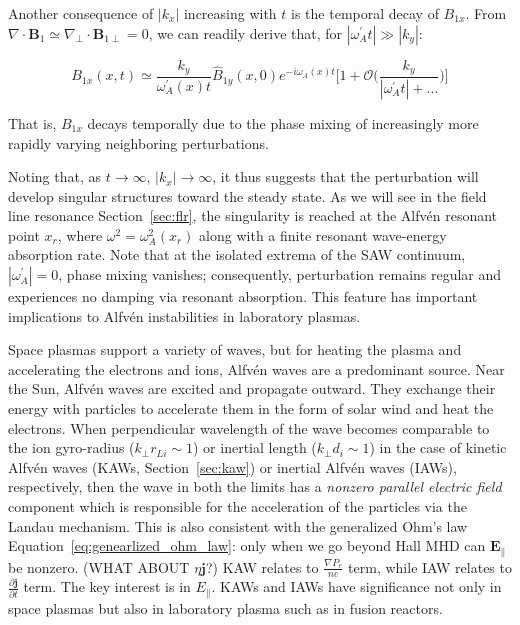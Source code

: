 \documentclass[
  notoc %
]{tufte-book}
\begin{document}
Another consequence of \(|k_x|\) increasing with \(t\) is the temporal
decay of \(B_{1x}\). From
\(\nabla\cdot\mathbf{B}_1 \simeq \nabla_\perp\cdot\mathbf{B}_{1\perp}=0\),
we can readily derive that, for \(|\omega_A^\prime t|\gg |k_y|\):

\[
B_{1x}(x, t)\simeq \frac{k_y}{\omega_A^\prime(x)t}\hat{B}_{1y}(x,0)e^{-i\omega_A(x)t}\Big[ 1+\mathcal{O}\Big( \frac{k_y}{|\omega_A^\prime t|+ ...} \Big) \Big]
\]

That is, \(B_{1x}\) decays temporally due to the phase mixing of
increasingly more rapidly varying neighboring perturbations.

Noting that, as \(t\rightarrow\infty\), \(|k_x|\rightarrow\infty\), it
thus suggests that the perturbation will develop singular structures
toward the steady state. As we will see in the field line resonance
Section~\ref{sec:flr}, the singularity is reached at the Alfvén resonant
point \(x_r\), where \(\omega^2=\omega_A^2(x_r)\) along with a finite
resonant wave-energy absorption rate. Note that at the isolated extrema
of the SAW continuum, \(|\omega_A^\prime|=0\), phase mixing vanishes;
consequently, perturbation remains regular and experiences no damping
via resonant absorption. This feature has important implications to
Alfvén instabilities in laboratory plasmas.

Space plasmas support a variety of waves, but for heating the plasma and
accelerating the electrons and ions, Alfvén waves are a predominant
source. Near the Sun, Alfvén waves are excited and propagate outward.
They exchange their energy with particles to accelerate them in the form
of solar wind and heat the electrons. When perpendicular wavelength of
the wave becomes comparable to the ion gyro-radius
(\(k_\perp r_{Li}\sim 1\)) or inertial length (\(k_\perp d_i \sim 1\))
in the case of kinetic Alfvén waves (KAWs, Section~\ref{sec:kaw}) or
inertial Alfvén waves (IAWs), respectively, then the wave in both the
limits has a \emph{nonzero parallel electric field} component which is
responsible for the acceleration of the particles via the Landau
mechanism. This is also consistent with the generalized Ohm's law
Equation~\ref{eq:genearlized_ohm_law}: only when we go beyond Hall MHD
can \(\mathbf{E}_\parallel\) be nonzero. (WHAT ABOUT
\(\eta\mathbf{j}\)?) KAW relates to \(\frac{\nabla P_e}{ne}\) term,
while IAW relates to \(\frac{\partial \mathbf{j}}{\partial t}\) term.
The key interest is in \(E_\parallel\). KAWs and IAWs have significance
not only in space plasmas but also in laboratory plasma such as in
fusion reactors.
\end{document}
